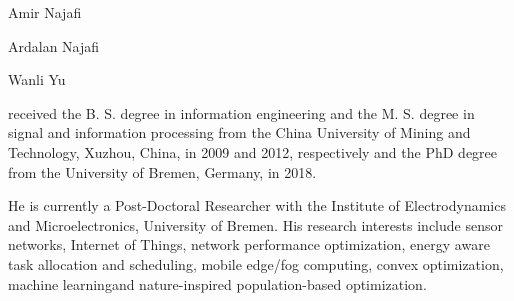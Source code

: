 \begin{IEEEbiography}{Amir Najafi}
\end{IEEEbiography}

\begin{IEEEbiography}{Ardalan Najafi}
\end{IEEEbiography}

\begin{IEEEbiography}{Wanli Yu}
	
	received the B. S. degree in information engineering and the M. S. degree in signal and information processing from the China University of Mining and Technology, Xuzhou, China, in 2009 and 2012, respectively and the PhD degree from the University of Bremen, Germany, in 2018.
	
	He is currently a Post-Doctoral Researcher with the Institute of Electrodynamics and Microelectronics, University of Bremen. His research interests include sensor networks, Internet of Things, network performance optimization, energy aware task allocation and scheduling, mobile edge/fog computing, convex optimization, machine learningand nature-inspired population-based optimization.
\end{IEEEbiography}

